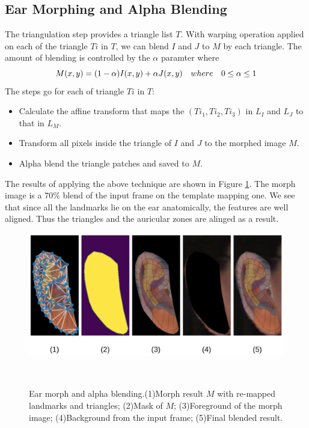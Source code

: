 \subsection{Ear Morphing and Alpha Blending}
\label{sec:morph}
The triangulation step provides a triangle list $T$. With warping operation applied on each of the triangle $Ti$ in $T$, we can blend $I$ and $J$ to $M$ by each triangle. The amount of blending is controlled by the $\alpha$ paramter where
\begin{equation}
  \label{equ:blend}
    M(x,y) = (1-\alpha) I(x,y) +  \alpha J(x,y)\\
    \quad where \quad 0\le \alpha \le 1
\end{equation}
The steps go for each of triangle $Ti$ in $T$:
\begin{itemize}
  \item Calculate the affine transform that maps the $(Ti_1, Ti_2, Ti_3)$ in $L_I$ and $L_J$ to that in $L_M$.
  \item Transform all pixels inside the triangle of $I$ and $J$ to the morphed image $M$.
  \item Alpha blend the triangle patches and saved to $M$.
\end{itemize}
The results of applying the above technique are shown in Figure \ref{fig:morph}. The morph image is a $70\%$ blend of the input frame on the template mapping one. We see that since all the landmarks lie on the ear anatomically, the features are well aligned. Thus the triangles and the auricular zones are alinged as a result.
\begin{figure}
  \centering
    \includegraphics[width=\columnwidth]{figures/morph-res.png}
    \caption{Ear morph and alpha blending.(1)Morph result $M$ with re-mapped landmarks and triangles; (2)Mask of $M$; (3)Foreground of the morph image; (4)Background from the input frame; (5)Final blended result.}~\label{fig:morph}
  \end{figure}


